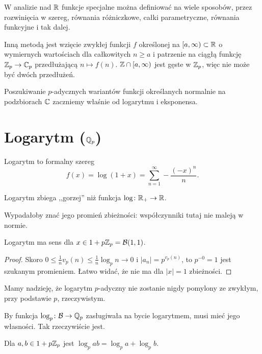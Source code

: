 W analizie nad $\mathbb R$ funkcje specjalne można definiować na wiele sposobów, przez rozwinięcia w szereg, równania różniczkowe, całki parametryczne, równania funkcyjne i tak dalej.

Inną metodą jest wzięcie zwykłej funkcji $f$ określonej na $[a, \infty) \subset \mathbb R$ o wymiernych wartościach dla całkowitych $n \ge a$ i patrzenie na ciągłą funkcję $\mathbb Z_p \to \mathbb C_p$ przedłużającą $n \mapsto f(n)$.
$\mathbb Z \cap [a, \infty)$ jest gęste w $\mathbb Z_p$, więc nie może być dwóch przedłużeń.

Poszukiwanie $p$-adycznych wariantów funkcji określanych normalnie na podzbiorach $\mathbb C$ zaczniemy właśnie od logarytmu i eksponensa.

\section{Logarytm ($\mathbb Q_p$)}
\begin{definicja}
	Logarytm  to formalny szereg
	\[
		f(x) = \log(1+x) = \sum_{n = 1}^\infty - \frac{(-x)^n}{n}.
	\]
\end{definicja}

Logarytm zbiega ,,gorzej'' niż funkcja $\log \colon \mathbb R_+ \to \mathbb R$.

Wypadałoby znać jego promień zbieżności: współczynniki tutaj nie maleją w normie.

\begin{fakt}
	Logarytm ma sens dla $x \in 1 + p\mathbb Z_p = \mathcal B(1,1)$.
\end{fakt}

\begin{proof}
Skoro $0 \le \frac 1 n v_p (n) \le \frac 1 n \log_p n \to 0$ i $|a_n| = p^{v_p(n)}$, to $p^{-0} = 1$ jest szukanym promieniem.
Łatwo widać, że nie ma dla $|x| = 1$ zbieżności.
\end{proof}

Mamy nadzieję, że logarytm $p$-adyczny nie zostanie nigdy pomylony ze zwykłym, przy podstawie $p$, rzeczywistym.

By funkcja $\log_p \colon \mathcal B \to \mathbb Q_p$ zasługiwała na bycie logarytmem, musi mieć jego własności. Tak rzeczywiście jest.

\begin{fakt}
	Dla $a, b \in 1+p\mathbb Z_p$ jest $\log_p ab = \log_p a + \log_p b$.
\end{fakt}

